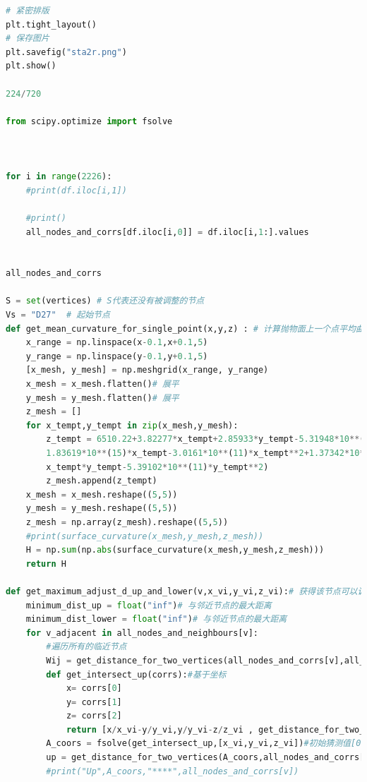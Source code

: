 \documentclass[withoutpreface,bwprint]{cumcmthesis} %
\begin{document}
\begin{appendices}
\begin{lstlisting}[language=python]
# 紧密排版
plt.tight_layout()
# 保存图片
plt.savefig("sta2r.png")
plt.show()

224/720

from scipy.optimize import fsolve



for i in range(2226):
    #print(df.iloc[i,1])

    #print()
    all_nodes_and_corrs[df.iloc[i,0]] = df.iloc[i,1:].values

    
all_nodes_and_corrs    

S = set(vertices) # S代表还没有被调整的节点
Vs = "D27"  # 起始节点
def get_mean_curvature_for_single_point(x,y,z) : # 计算抛物面上一个点平均曲率
    x_range = np.linspace(x-0.1,x+0.1,5)
    y_range = np.linspace(y-0.1,y+0.1,5)
    [x_mesh, y_mesh] = np.meshgrid(x_range, y_range)
    x_mesh = x_mesh.flatten()# 展平
    y_mesh = y_mesh.flatten()# 展平
    z_mesh = [] 
    for x_tempt,y_tempt in zip(x_mesh,y_mesh):
        z_tempt = 6510.22+3.82277*x_tempt+2.85933*y_tempt-5.31948*10**(-6)*np.sqrt(1.63902*10**(18)+
        1.83619*10**(15)*x_tempt-3.0161*10**(11)*x_tempt**2+1.37342*10**(15)*y_tempt+8.06466*10**(11)*
        x_tempt*y_tempt-5.39102*10**(11)*y_tempt**2)
        z_mesh.append(z_tempt)
    x_mesh = x_mesh.reshape((5,5))
    y_mesh = y_mesh.reshape((5,5))
    z_mesh = np.array(z_mesh).reshape((5,5))
    #print(surface_curvature(x_mesh,y_mesh,z_mesh))
    H = np.sum(np.abs(surface_curvature(x_mesh,y_mesh,z_mesh)))
    return H

def get_maximum_adjust_d_up_and_lower(v,x_vi,y_vi,z_vi):# 获得该节点可以调节的最大上距离和下距离
    minimum_dist_up = float("inf")# 与邻近节点的最大距离
    minimum_dist_lower = float("inf")# 与邻近节点的最大距离
    for v_adjacent in all_nodes_and_neighbours[v]:
        #遍历所有的临近节点
        Wij = get_distance_for_two_vertices(all_nodes_and_corrs[v],all_nodes_and_corrs[v_adjacent])
        def get_intersect_up(corrs):#基于坐标
            x= corrs[0]
            y= corrs[1]
            z= corrs[2]
            return [x/x_vi-y/y_vi,y/y_vi-z/z_vi , get_distance_for_two_vertices([x,y,z],all_nodes_and_corrs[v_adjacent])-Wij*(1-0.0007)]
        A_coors = fsolve(get_intersect_up,[x_vi,y_vi,z_vi])#初始猜测值[0,-1]
        up = get_distance_for_two_vertices(A_coors,all_nodes_and_corrs[v])
        #print("Up",A_coors,"****",all_nodes_and_corrs[v])
        

\end{lstlisting}
\end{appendices}
\end{document}
